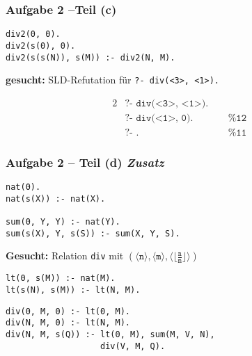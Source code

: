 \documentclass{beamer}
\newcommand{\num}[1]{\ensuremath{\langle #1 \rangle}}
\begin{document}
\begin{frame}[fragile] \frametitle{Aufgabe 2 --Teil (c)}
	\begin{lstlisting}[firstnumber=10]
div2(0, 0).
div2(s(0), 0).
div2(s(s(N)), s(M)) :- div2(N, M).
	\end{lstlisting}

	\textbf{gesucht:} SLD-Refutation für \texttt{?- div(<3>, <1>).}
	
	\begin{alignat*}{2}
		&\texttt{?- div(<3>, <1>).} \\
		&\texttt{?- div(<1>, 0).} \qquad && \texttt{\% 12 } \\
		&\texttt{?- .} && \texttt{\% 11 }
	\end{alignat*}
	
\end{frame}
\begin{frame}[fragile] \frametitle{Aufgabe 2 -- Teil (d) \hfill \textit{Zusatz}}
	\footnotesize
	\begin{lstlisting}
nat(0).
nat(s(X)) :- nat(X).

sum(0, Y, Y) :- nat(Y).
sum(s(X), Y, s(S)) :- sum(X, Y, S).
	\end{lstlisting}
	
	\textbf{Gesucht:} Relation \texttt{div} mit $(\num{\texttt{n}} , \num{\texttt{m}} , \num{\lfloor \frac{\texttt{n}}{\texttt{m}} \rfloor})$
	
	\pause
	
	\begin{lstlisting}[firstnumber=14]
lt(0, s(M)) :- nat(M).
lt(s(N), s(M)) :- lt(N, M).
	\end{lstlisting}
	
	\pause
	
	\begin{lstlisting}[firstnumber=17]
div(0, M, 0) :- lt(0, M).
div(N, M, 0) :- lt(N, M).
div(N, M, s(Q)) :- lt(0, M), sum(M, V, N), 
                   div(V, M, Q).
	\end{lstlisting}
\end{frame}
\end{document}
